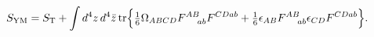 \begin{equation}
\label{2.6}
S_{\rm YM} = S_{\rm T} + \int d^4z\, d^4\bar{z}\, {\rm tr} \Bigr\{
\hbox{$\frac{1}{6}$} \Omega_{ABCD} F^{AB}_{\!~~~~ab} F^{CD ab} +
\hbox{$\frac{1}{6}$} \epsilon_{AB} F^{AB}_{\!~~~~ab}
\epsilon_{CD} F^{CD ab} \Bigr\}.
\end{equation}

